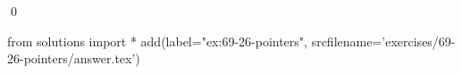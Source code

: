 
\begin{ex}
  \label{ex:69-26-pointers}
  
  \qed
\end{ex}
\begin{python0}
from solutions import *
add(label="ex:69-26-pointers",
    srcfilename='exercises/69-26-pointers/answer.tex')
\end{python0}
